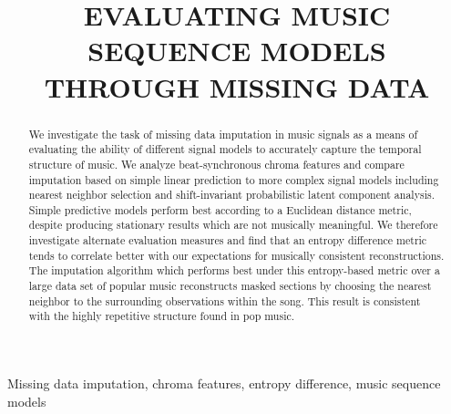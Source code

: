 \documentclass{article}
\title{EVALUATING MUSIC SEQUENCE MODELS THROUGH MISSING DATA}
\begin{document}
\ninept
%
\maketitle
%
\begin{abstract}
  We investigate the task of missing data imputation in music signals
  as a means of evaluating the ability of different signal models to
  accurately capture the temporal structure of music.
  We analyze beat-synchronous chroma features and compare imputation
  based on simple linear prediction to more complex
  signal models including nearest neighbor selection and
  shift-invariant probabilistic latent component analysis.
  Simple predictive models perform best according to a Euclidean
  distance metric, despite producing stationary results which are not
  musically meaningful.  We therefore investigate alternate evaluation
  measures %
  and find that an entropy difference %
  metric tends to correlate
  better with our %
  expectations for musically consistent reconstructions.
  The imputation algorithm which performs best under this
  entropy-based metric over a large data set of popular music
  reconstructs masked sections by choosing the nearest neighbor to the
  surrounding observations within the song.
  This result is consistent with the highly repetitive structure 
  found in pop music.
\end{abstract}
%
\begin{keywords}
Missing data imputation, chroma features, entropy difference,
music sequence models
\end{keywords}
%

\end{document}

